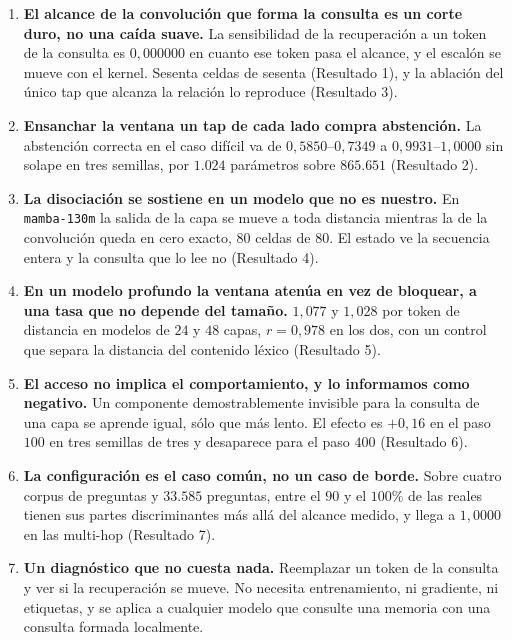 \documentclass[11pt,a4paper]{article}
\begin{document}
\begin{enumerate}
\item \textbf{El alcance de la convolución que forma la consulta es un corte duro, no una caída
suave.} La sensibilidad de la recuperación a un token de la consulta es $0{,}000000$ en cuanto ese
token pasa el alcance, y el escalón se mueve con el kernel. Sesenta celdas de sesenta (Resultado 1), y
la ablación del único tap que alcanza la relación lo reproduce (Resultado 3).

\item \textbf{Ensanchar la ventana un tap de cada lado compra abstención.} La abstención correcta en
el caso difícil va de $0{,}5850$--$0{,}7349$ a $0{,}9931$--$1{,}0000$ sin solape en tres semillas, por
$1{.}024$ parámetros sobre $865{.}651$ (Resultado 2).

\item \textbf{La disociación se sostiene en un modelo que no es nuestro.} En \texttt{mamba-130m} la
salida de la capa se mueve a toda distancia mientras la de la convolución queda en cero exacto,
$80$ celdas de $80$. El estado ve la secuencia entera y la consulta que lo lee no (Resultado 4).

\item \textbf{En un modelo profundo la ventana atenúa en vez de bloquear, a una tasa que no depende
del tamaño.} $1{,}077$ y $1{,}028$ por token de distancia en modelos de $24$ y $48$ capas,
$r = 0{,}978$ en los dos, con un control que separa la distancia del contenido léxico (Resultado 5).

\item \textbf{El acceso no implica el comportamiento, y lo informamos como negativo.} Un componente
demostrablemente invisible para la consulta de una capa se aprende igual, sólo que más lento. El
efecto es $+0{,}16$ en el paso $100$ en tres semillas de tres y desaparece para el paso $400$
(Resultado 6).

\item \textbf{La configuración es el caso común, no un caso de borde.} Sobre cuatro corpus de
preguntas y $33{.}585$ preguntas, entre el $90$ y el $100\%$ de las reales tienen sus partes
discriminantes más allá del alcance medido, y llega a $1{,}0000$ en las multi-hop (Resultado 7).

\item \textbf{Un diagnóstico que no cuesta nada.} Reemplazar un token de la consulta y ver si la
recuperación se mueve. No necesita entrenamiento, ni gradiente, ni etiquetas, y se aplica a cualquier
modelo que consulte una memoria con una consulta formada localmente.
\end{enumerate}
\end{document}
